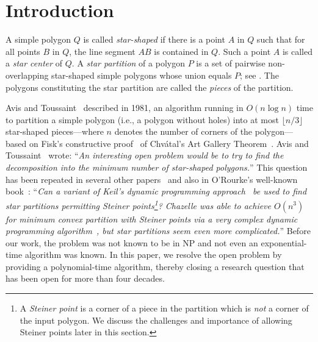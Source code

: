 \documentclass{theoretics}
\begin{document}


\section{Introduction}\label{sec:intro}

A simple polygon $Q$ is called \emph{star-shaped} if there is a point $A$ in $Q$ such that for all points $B$ in $Q$, the line segment $AB$ is contained in $Q$.
Such a point $A$ is called a \emph{star center} of $Q$.
A \emph{star partition} of a polygon $P$ is a set of pairwise non-overlapping star-shaped simple polygons whose union equals $P$; see .
The polygons constituting the star partition are called the \emph{pieces} of the partition.

Avis and Toussaint~\cite{DBLP:journals/pr/AvisT81} described in 1981, an algorithm running in $O(n\log n)$ time to partition a simple polygon (i.e., a polygon without holes) into at most $\lfloor n/3\rfloor$ star-shaped pieces---where $n$ denotes the number of corners of the polygon---based on Fisk's constructive proof~\cite{DBLP:journals/jct/Fisk78a} of Chv\'{a}tal's Art Gallery Theorem~\cite{chvatal1975combinatorial}.
Avis and Toussaint~\cite{DBLP:journals/pr/AvisT81} wrote: ``\emph{An interesting open problem would be to try to find the decomposition into the minimum number of star-shaped polygons.}''
This question has been repeated in several other papers~\cite{toussaint1982computational,DBLP:journals/tit/ORourkeS83,DBLP:journals/siamcomp/Keil85,DBLP:journals/pieee/Shermer92} and also in O'Rourke's well-known book~\cite{o1987art}: ``\emph{Can a variant of Keil's dynamic programming approach~\cite{DBLP:journals/siamcomp/Keil85} be used to find star partitions permitting Steiner points\footnote{\label{footnote:steiner-points}A \emph{Steiner point} is a corner of a piece in the partition which is \emph{not} a corner of the input polygon. We discuss the challenges and importance of allowing Steiner points later in this section.}? Chazelle was able to achieve $O(n^3)$ for minimum convex partition with Steiner points via a very complex dynamic programming algorithm~\cite{chazelle1980computational}, but star partitions seem even more complicated.}''
Before our work, the problem was not known to be in \textsf{NP} and not even an exponential-time algorithm was known.
In this paper, we resolve the open problem by providing a polynomial-time algorithm,
thereby closing a research question that has been open for more than four decades.
\end{document}
